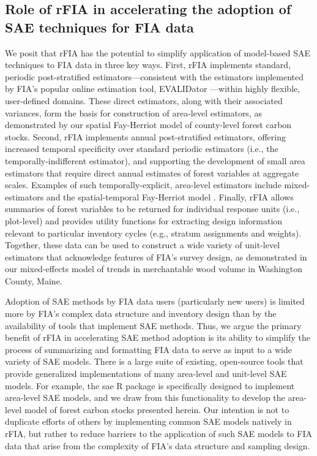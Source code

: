 \documentclass[11pt]{article}
\begin{document}
\subsection*{Role of rFIA in accelerating the adoption of SAE techniques for FIA data}
We posit that rFIA has the potential to simplify application of model-based SAE techniques to FIA data in three key ways. First, rFIA implements standard, periodic post-stratified estimators---consistent with the estimators implemented by FIA's popular online estimation tool, EVALIDator \citep{evalidator}---within highly flexible, user-defined domains. These direct estimators, along with their associated variances, form the basis for construction of area-level estimators, as demonstrated by our spatial Fay-Herriot model \citep{fay1979estimates, petrucci2006small, pratesi2008small} of county-level forest carbon stocks. Second, rFIA implements annual post-stratified estimators, offering increased temporal specificity over standard periodic estimators (i.e., the temporally-indifferent estimator), and supporting the development of small area estimators that require direct annual estimates of forest variables at aggregate scales. Examples of such temporally-explicit, area-level estimators include mixed-estimators \citep{van1999modeling} and the spatial-temporal Fay-Herriot model \citep{marhuenda2013small}. Finally, rFIA allows summaries of forest variables to be returned for individual response units (i.e., plot-level) and provides utility functions for extracting design information relevant to particular inventory cycles (e.g., stratum assignments and weights). Together, these data can be used to construct a wide variety of unit-level estimators that acknowledge features of FIA's survey design, as demonstrated in our mixed-effects model of trends in merchantable wood volume in Washington County, Maine. 

Adoption of SAE methods by FIA data users (particularly new users) is limited more by FIA's complex data structure and inventory design than by the availability of tools that implement SAE methods. Thus, we argue the primary benefit of rFIA in accelerating SAE method adoption is its ability to simplify the process of summarizing and formatting FIA data to serve as input to a wide variety of SAE models. There is a large suite of existing, open-source tools that provide generalized implementations of many area-level and unit-level SAE models. For example, the sae R package \citep{molina2015sae} is specifically designed to implement area-level SAE models, and we draw from this functionality to develop the area-level model of forest carbon stocks presented herein. Our intention is not to duplicate efforts of others by implementing common SAE models natively in rFIA, but rather to reduce barriers to the application of such SAE models to FIA data that arise from the complexity of FIA's data structure and sampling design. 
\end{document}
